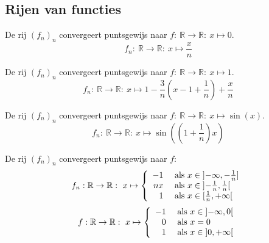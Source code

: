 \documentclass[main.tex]{subfiles}
\begin{document}
\subsection{Rijen van functies}

\begin{vb}
  De rij $(f_{n})_{n}$ convergeert puntsgewijs naar $f:\ \mathbb{R} \rightarrow \mathbb{R}:\ x \mapsto 0$.
  \[ f_{n}:\ \mathbb{R} \rightarrow \mathbb{R}:\ x \mapsto \frac{x}{n} \]
\end{vb}

\begin{vb}
  De rij $(f_{n})_{n}$ convergeert puntsgewijs naar $f:\ \mathbb{R} \rightarrow \mathbb{R}:\ x \mapsto 1$.
  \[ f_{n}:\ \mathbb{R} \rightarrow \mathbb{R}:\ x \mapsto 1- \frac{3}{n}\left(x-1+\frac{1}{n}\right) + \frac{x}{n} \]
\end{vb}

\begin{vb}
  De rij $(f_{n})_{n}$ convergeert puntsgewijs naar $f:\ \mathbb{R} \rightarrow \mathbb{R}:\ x \mapsto \sin(x)$.
  \[ f_{n}:\ \mathbb{R} \rightarrow \mathbb{R}:\ x \mapsto \sin\left(\left(1+\frac{1}{n}\right)x\right) \]
\end{vb}

\begin{vb}
  De rij $(f_{n})_{n}$ convergeert puntsgewijs naar $f$:
  \[
  f_{n}: \mathbb{R} \rightarrow \mathbb{R}:\ x \mapsto
  \left\{
    \begin{array}{rl}
      -1 & \text{ als } x \in \interval[open left ]{-\infty}{-\frac{1}{n}}\\
      nx & \text{ als } x \in \interval[open      ]{-\frac{1}{n}}{\frac{1}{n}}\\
      1  & \text{ als } x \in \interval[open right]{\frac{1}{n}}{+\infty}\\
    \end{array}
  \right.
  \]
  \[
  f: \mathbb{R} \rightarrow \mathbb{R}:\ x \mapsto
  \left\{
    \begin{array}{rl}
      -1 & \text{ als } x \in \interval[open]{-\infty}{0}\\
      0  & \text{ als } x = 0\\
      1  & \text{ als } x \in \interval[open]{0}{+\infty}\\
    \end{array}
  \right.
  \]
\end{vb}
\end{document}
